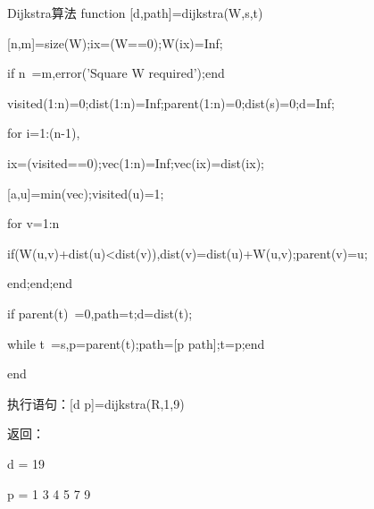 \documentclass[10pt]{beamer}
\begin{document}
\begin{frame}[allowframebreaks]{Dijkstra算法}
function [d,path]=dijkstra(W,s,t)

[n,m]=size(W);ix=(W==0);W(ix)=Inf;

if n~=m,error('Square W required');end

visited(1:n)=0;dist(1:n)=Inf;parent(1:n)=0;dist(s)=0;d=Inf;

for i=1:(n-1),

ix=(visited==0);vec(1:n)=Inf;vec(ix)=dist(ix);

[a,u]=min(vec);visited(u)=1;

for v=1:n

if(W(u,v)+dist(u)<dist(v)),dist(v)=dist(u)+W(u,v);parent(v)=u;

end;end;end

if parent(t)~=0,path=t;d=dist(t);

while t~=s,p=parent(t);path=[p path];t=p;end

end

执行语句：[d p]=dijkstra(R,1,9)

返回：

d = 19

p = 1     3     4     5     7     9

\end{frame}
\end{document}
